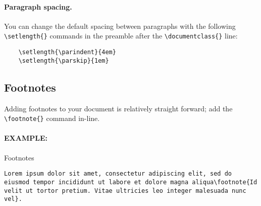 \documentclass[11pt]{article}
\begin{document}
\paragraph{Paragraph spacing.} You can change the default spacing between paragraphs with the following \verb|\setlength{}| commands in the preamble after the \verb|\documentclass{}| line:

\begin{lstlisting}
    \setlength{\parindent}{4em}
    \setlength{\parskip}{1em}
\end{lstlisting}




\subsection*{Footnotes}

Adding footnotes to your document is relatively straight forward; add the \verb|\footnote{}| command in-line.

\paragraph{EXAMPLE:} Footnotes

\begin{lstlisting}
Lorem ipsum dolor sit amet, consectetur adipiscing elit, sed do eiusmod tempor incididunt ut labore et dolore magna aliqua\footnote{Id velit ut tortor pretium. Vitae ultricies leo integer malesuada nunc vel}.
\end{lstlisting}
\end{document}
